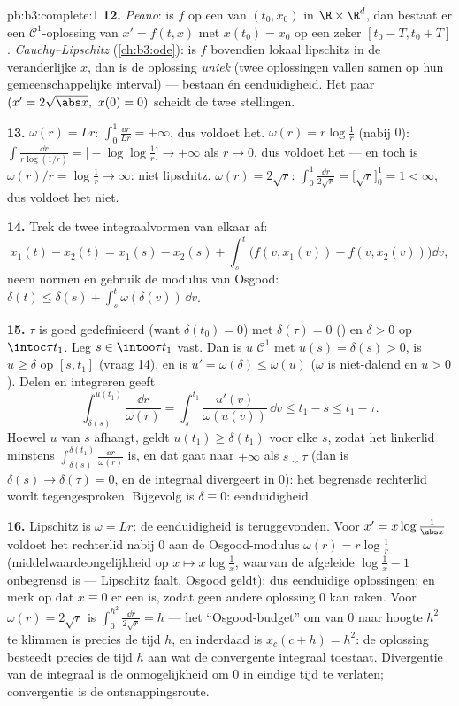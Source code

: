 \begin{solution}{pb:b3:complete:1}
\textbf{12.} \emph{Peano}: is $f$  op een  van
$(t_0, x_0)$ in $\R\times\R^d$, dan bestaat er een $\mathcal
C^1$-oplossing van $x' = f(t,x)$ met $x(t_0) = x_0$ op een zeker
$[t_0 - T, t_0 + T]$. \emph{Cauchy--Lipschitz}
(\cref{ch:b3:ode}): is $f$ bovendien lokaal lipschitz in de
veranderlijke $x$, dan is de oplossing \emph{uniek} (twee
oplossingen vallen samen op hun gemeenschappelijke interval) ---
bestaan én eenduidigheid. Het paar $(x' = 2\sqrt{\abs x},\ x(0) =
0)$ scheidt de twee stellingen.

\textbf{13.} $\omega(r) = Lr$: $\int_0^1\frac{\dd r}{Lr} =
+\infty$, dus voldoet het. $\omega(r) = r\log\frac1r$ (nabij $0$):
$\int\frac{\dd r}{r\log(1/r)} = \bigl[-\log\log\frac1r\bigr] \to
+\infty$ als $r \to 0$, dus voldoet het --- en toch is
$\omega(r)/r = \log\frac1r \to \infty$: niet lipschitz.
$\omega(r) = 2\sqrt r$: $\int_0^1\frac{\dd r}{2\sqrt r} =
\bigl[\sqrt r\bigr]_0^1 = 1 < \infty$, dus voldoet het niet.

\textbf{14.} Trek de twee integraalvormen van elkaar af:
\[
x_1(t) - x_2(t) = x_1(s) - x_2(s) + \int_s^t\bigl(f(v,
x_1(v)) - f(v, x_2(v))\bigr)\dd v,
\]
neem normen en gebruik de modulus van Osgood: $\delta(t) \leq
\delta(s) + \int_s^t\omega(\delta(v))\,\dd v$.

\textbf{15.} $\tau$ is goed gedefinieerd (want $\delta(t_0) = 0$)
met $\delta(\tau) = 0$ () en $\delta > 0$ op
$\intoc\tau{t_1}$. Leg $s \in \intoo\tau{t_1}$ vast. Dan is $u$
$\mathcal C^1$ met $u(s) = \delta(s) > 0$, is $u \geq \delta$ op
$[s, t_1]$ (vraag 14), en is $u' = \omega(\delta) \leq \omega(u)$
($\omega$ is niet-dalend en $u > 0$). Delen en integreren geeft
\[
\int_{\delta(s)}^{u(t_1)}\frac{\dd r}{\omega(r)}
= \int_s^{t_1}\frac{u'(v)}{\omega(u(v))}\,\dd v \leq t_1 - s
\leq t_1 - \tau .
\]
Hoewel $u$ van $s$ afhangt, geldt $u(t_1) \geq \delta(t_1)$ voor
elke $s$, zodat het linkerlid minstens
$\int_{\delta(s)}^{\delta(t_1)}\frac{\dd r}{\omega(r)}$ is, en dat
gaat naar $+\infty$ als $s \downarrow \tau$ (dan is $\delta(s) \to
\delta(\tau) = 0$, en de integraal divergeert in $0$): het
begrensde rechterlid wordt tegengesproken. Bijgevolg is $\delta
\equiv 0$: eenduidigheid.

\textbf{16.} Lipschitz is $\omega = Lr$: de eenduidigheid is
teruggevonden. Voor $x' = x\log\frac1{\abs x}$ voldoet het
rechterlid nabij $0$ aan de Osgood-modulus $\omega(r) =
r\log\frac1r$ (middelwaardeongelijkheid op $x \mapsto
x\log\frac1x$, waarvan de afgeleide $\log\frac1x - 1$ onbegrensd
is --- Lipschitz faalt, Osgood geldt): dus eenduidige oplossingen;
en merk op dat $x \equiv 0$ er een is, zodat geen andere oplossing
$0$ kan raken. Voor $\omega(r) = 2\sqrt r$ is
$\int_0^{h^2}\frac{\dd r}{2\sqrt r} = h$ --- het
``Osgood-budget'' om van $0$ naar hoogte $h^2$ te klimmen is
precies de tijd $h$, en inderdaad is $x_c(c + h) = h^2$: de
oplossing besteedt precies de tijd $h$ aan wat de convergente
integraal toestaat. Divergentie van de integraal is de
onmogelijkheid om $0$ in eindige tijd te verlaten; convergentie is
de ontsnappingsroute.


\end{solution}
